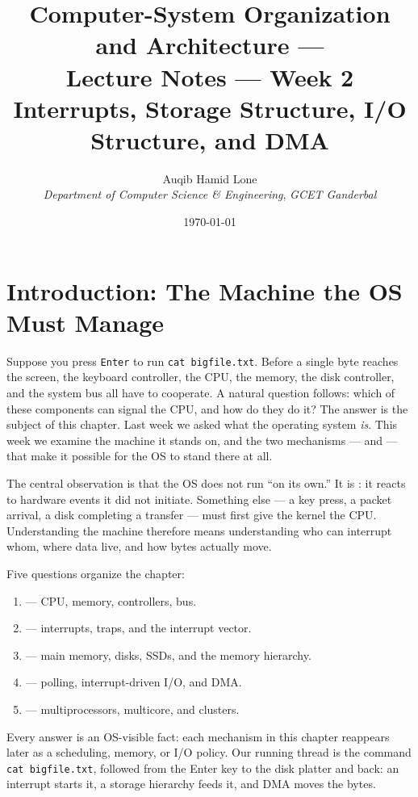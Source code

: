 \documentclass[11pt]{article}
\title{Computer-System Organization and Architecture ---\\
  Lecture Notes --- Week 2\\[0.3em]
  \large Interrupts, Storage Structure, I/O Structure, and DMA}
\author{Auqib Hamid Lone\\[0.3em]
  \emph{Department of Computer Science \& Engineering}, \emph{GCET Ganderbal}}
\date{\today}
\begin{document}
\maketitle

\section{Introduction: The Machine the OS Must Manage}

Suppose you press \texttt{Enter} to run \texttt{cat bigfile.txt}. Before a single byte reaches the screen, the keyboard controller, the CPU, the memory, the disk controller, and the system bus all have to cooperate. A natural question follows: which of these components can signal the CPU, and how do they do it? The answer is the subject of this chapter. Last week we asked what the operating system \emph{is}. This week we examine the machine it stands on, and the two mechanisms ---  and  --- that make it possible for the OS to stand there at all.

The central observation is that the OS does not run ``on its own.'' It is : it reacts to hardware events it did not initiate. Something else --- a key press, a packet arrival, a disk completing a transfer --- must first give the kernel the CPU. Understanding the machine therefore means understanding who can interrupt whom, where data live, and how bytes actually move.

Five questions organize the chapter:

\begin{enumerate}
  \item {} --- CPU, memory, controllers, bus.
  \item {} --- interrupts, traps, and the interrupt vector.
  \item {} --- main memory, disks, SSDs, and the memory hierarchy.
  \item {} --- polling, interrupt-driven I/O, and DMA.
  \item {} --- multiprocessors, multicore, and clusters.
\end{enumerate}

Every answer is an OS-visible fact: each mechanism in this chapter reappears later as a scheduling, memory, or I/O policy. Our running thread is the command \texttt{cat bigfile.txt}, followed from the Enter key to the disk platter and back: an interrupt starts it, a storage hierarchy feeds it, and DMA moves the bytes.
\end{document}
